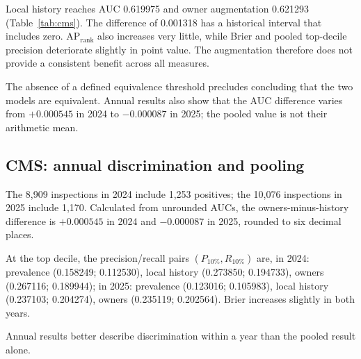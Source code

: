 Local history reaches AUC 0.619975 and owner augmentation 0.621293 (Table~\ref{tab:cms}). The difference of 0.001318 has a historical interval that includes zero. $\mathrm{AP}_{\mathrm{rank}}$ also increases very little, while Brier and pooled top-decile precision deteriorate slightly in point value. The augmentation therefore does not provide a consistent benefit across all measures\cite{hgbresults}.

The absence of a defined equivalence threshold precludes concluding that the two models are equivalent. Annual results also show that the AUC difference varies from $+0.000545$ in 2024 to $-0.000087$ in 2025; the pooled value is not their arithmetic mean\cite{hgbresults}.


\subsection{CMS: annual discrimination and pooling}
\label{sec:cmsannual}

\begin{table}[!htbp]
\centering\footnotesize
\caption{CMS: test results by year, transcribed from the frozen analysis. Prevalence is 14.0644\,\% in 2024 and 11.6118\,\% in 2025. AP uses the code's rank convention. The supplement includes 2023 validation\cite{hgbanalysis}.}
\label{tab:cmsannual}

\end{table}

The 8,909 inspections in 2024 include 1,253 positives; the 10,076 inspections in 2025 include 1,170. Calculated from unrounded AUCs, the owners-minus-history difference is $+0.000545$ in 2024 and $-0.000087$ in 2025, rounded to six decimal places.

At the top decile, the precision/recall pairs $(P_{10\%},R_{10\%})$ are, in 2024: prevalence (0.158249; 0.112530), local history (0.273850; 0.194733), owners (0.267116; 0.189944); in 2025: prevalence (0.123016; 0.105983), local history (0.237103; 0.204274), owners (0.235119; 0.202564). Brier increases slightly in both years.

Annual results better describe discrimination within a year than the pooled result alone.

